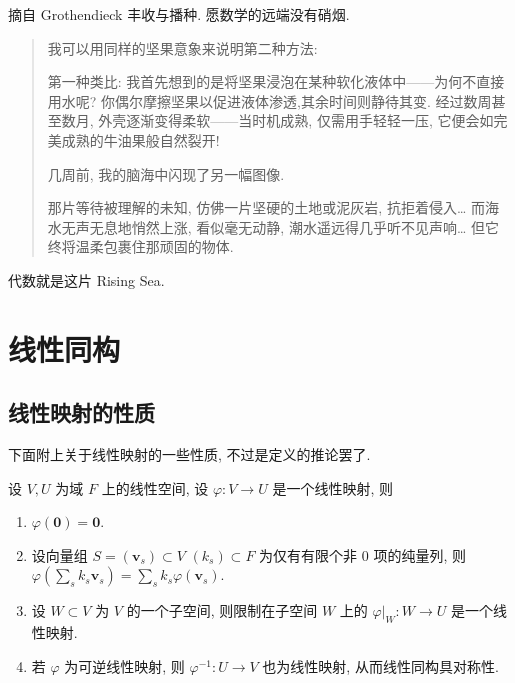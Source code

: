 \documentclass[UTF8]{book}
\begin{document}
\vspace*{5em}

摘自 Grothendieck 丰收与播种. 愿数学的远端没有硝烟. 

\begin{quotation}
    
    \kaishu   
    我可以用同样的坚果意象来说明第二种方法: 
    
    第一种类比: 
    我首先想到的是将坚果浸泡在某种软化液体中——为何不直接用水呢? 
    你偶尔摩擦坚果以促进液体渗透,其余时间则静待其变. 
    经过数周甚至数月, 外壳逐渐变得柔软——当时机成熟, 仅需用手轻轻一压, 
    它便会如完美成熟的牛油果般自然裂开! 

    几周前, 我的脑海中闪现了另一幅图像. 
      
    那片等待被理解的未知, 仿佛一片坚硬的土地或泥灰岩, 抗拒着侵入\dots
    而海水无声无息地悄然上涨, 看似毫无动静, 潮水遥远得几乎听不见声响\dots 
    但它终将温柔包裹住那顽固的物体. 
    
\end{quotation}

代数就是这片 Rising Sea. 

\setcounter{chapter}{8}
\chapter{线性同构}
\section{线性映射的性质}

下面附上关于线性映射的一些性质, 不过是定义的推论罢了. 

\begin{proposition}
    设 $V,U$ 为域 $F$ 上的线性空间, 
    设 $\varphi: V \to U$ 是一个线性映射, 则 
    \begin{enumerate}[(1)]
        \item $\varphi(\boldsymbol{0}) = \boldsymbol{0}$. 

        \item 设向量组 $S = (\boldsymbol{v}_s) \subset V$
        $(k_s)\subset F$ 为仅有有限个非 0 项的纯量列, 
        则 $\varphi(\sum_{s} k_s \boldsymbol{v}_s)
        = \sum_s k_s \varphi(\boldsymbol{v}_s)$. 

        \item 设 $W \subset V$ 为 $V$ 的一个子空间, 
        则限制在子空间 $W$ 上的
         $\varphi|_W : W \to U$ 是一个线性映射. 

        \item 若 $\varphi$ 为可逆线性映射, 
        则 $\varphi^{-1} : U \to V$ 也为线性映射, 
        从而线性同构具对称性. 

    \end{enumerate}
\end{proposition}
\end{document}
